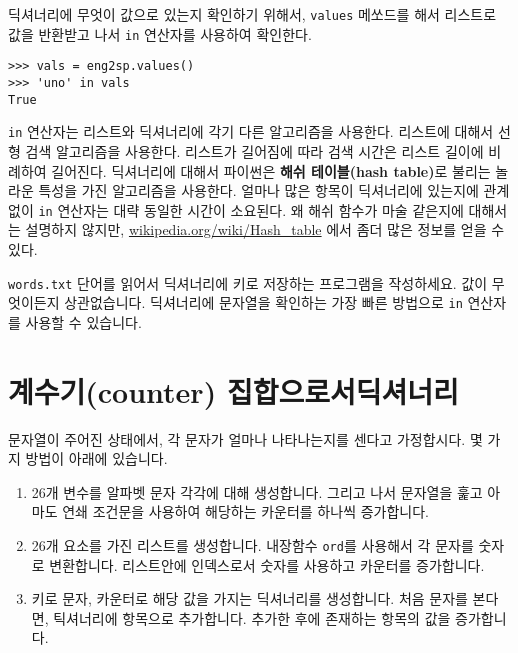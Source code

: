딕셔너리에 무엇이 값으로 있는지 확인하기 위해서, {\tt values} 메쏘드를 해서 리스트로 값을 반환받고 나서 {\tt in} 연산자를 사용하여 확인한다.  


\beforeverb
\begin{verbatim}
>>> vals = eng2sp.values()
>>> 'uno' in vals
True
\end{verbatim}
\afterverb
%

{\tt in} 연산자는 리스트와 딕셔너리에 각기 다른 알고리즘을 사용한다. 
리스트에 대해서 선형 검색 알고리즘을 사용한다.
리스트가 길어짐에 따라 검색 시간은 리스트 길이에 비례하여 길어진다. 
딕셔너리에 대해서 파이썬은 {\bf 해쉬 테이블(hash table)}로 불리는 놀라운 특성을 가진 알고리즘을 사용한다. 
얼마나 많은 항목이 딕셔너리에 있는지에 관계없이 {\tt in} 연산자는 대략 동일한 시간이 소요된다.
왜 해쉬 함수가 마술 같은지에 대해서는 설명하지 않지만, \url{wikipedia.org/wiki/Hash_table} 에서 좀더 많은 정보를 얻을 수 있다. 


\begin{ex}
\label{wordlist2}


{\tt words.txt} 단어를 읽어서 딕셔너리에 키로 저장하는 프로그램을 작성하세요.
값이 무엇이든지 상관없습니다. 
딕셔너리에 문자열을 확인하는 가장 빠른 방법으로 {\tt in} 연산자를 사용할 수 있습니다.

\end{ex}


\section{계수기(counter) 집합으로서딕셔너리}
\label{histogram}


문자열이 주어진 상태에서, 각 문자가 얼마나 나타나는지를 센다고 가정합시다.
몇 가지 방법이 아래에 있습니다.

\begin{enumerate}

\item 26개 변수를 알파벳 문자 각각에 대해 생성합니다. 그리고 나서 문자열을 훑고 아마도 연쇄 조건문을 사용하여 해당하는 카운터를 하나씩 증가합니다.

\item 26개 요소를 가진 리스트를 생성합니다. 내장함수 {\tt ord}를 사용해서 각 문자를 숫자로 변환합니다. 리스트안에 인덱스로서 숫자를 사용하고 카운터를 증가합니다.

\item 키로 문자, 카운터로 해당 값을 가지는 딕셔너리를 생성합니다. 처음 문자를 본다면, 틱셔너리에 항목으로 추가합니다.
추가한 후에 존재하는 항목의 값을 증가합니다.

\end{enumerate}

